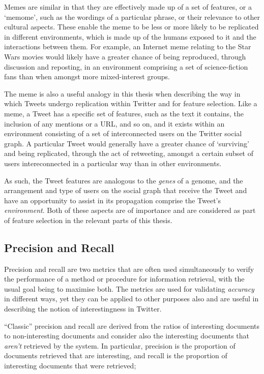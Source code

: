 Memes are similar in that they are effectively made up of a set of features, or a `memome', such as the wordings of a particular phrase, or their relevance to other cultural aspects. These enable the meme to be less or more likely to be replicated in different environments, which is made up of the humans exposed to it and the interactions between them. For example, an Internet meme relating to the Star Wars movies would likely have a greater chance of being reproduced, through discussion and reposting, in an environment comprising a set of science-fiction fans than when amongst more mixed-interest groups.

The meme is also a useful analogy in this thesis when describing the way in which Tweets undergo replication within Twitter and for feature selection. Like a meme, a Tweet has a specific set of features, such as the text it contains, the inclusion of any mentions or a URL, and so on, and it exists within an environment consisting of a set of interconnected users on the Twitter social graph. A particular Tweet would generally have a greater chance of `surviving' and being replicated, through the act of retweeting, amongst a certain subset of users intereconnected in a particular way than in other environments.

As such, the Tweet features are analogous to the \textit{genes} of a genome, and the arrangement and type of users on the social graph that receive the Tweet and have an opportunity to assist in its propagation comprise the Tweet's \textit{environment}. Both of these aspects are of importance and are considered as part of feature selection in the relevant parts of this thesis.


\subsection{Precision and Recall}
Precision and recall are two metrics that are often used simultaneously to verify the performance of a method or procedure for information retrieval, with the usual goal being to maximise both. The metrics are used for validating \textit{accuracy} in different ways, yet they can be applied to other purposes also and are useful in describing the notion of interestingness in Twitter.

``Classic'' precision and recall are derived from the ratios of interesting documents to non-interesting documents and consider also the interesting documents that \textit{aren't} retrieved by the system. In particular, precision is the proportion of documents retrieved that are interesting, and recall is the proportion of interesting documents that were retrieved;

